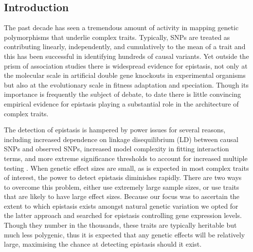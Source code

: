 \documentclass{article}
\begin{document}
\subsection{Introduction}
The past decade has seen a tremendous amount of activity in mapping genetic polymorphisms that underlie complex traits. Typically, SNPs are treated as contributing linearly, independently, and cumulatively to the mean of a trait and this has been successful in identifying hundreds of causal variants. Yet outside the prism of association studies there is widespread evidence for epistasis, not only at the molecular scale in artificial double gene knockouts in experimental organisms but also at the evolutionary scale in fitness adaptation and speciation. Though its importance is frequently the subject of debate, to date there is little convincing empirical evidence for epistasis playing a substantial role in the architecture of complex traits.

The detection of epistasis is hampered by power issues for several reasons, including increased dependence on linkage disequilibrium (LD) between causal SNPs and observed SNPs, increased model complexity in fitting interaction terms, and more extreme significance thresholds to account for increased multiple testing \cite{Hemani2013}. When genetic effect sizes are small, as is expected in most complex traits of interest, the power to detect epistasis diminishes rapidly. There are two ways to overcome this problem, either use extremely large sample sizes, or use traits that are likely to have large effect sizes. Because our focus was to ascertain the extent to which epistasis exists amongst natural genetic variation we opted for the latter approach and searched for epistasis controlling gene expression levels. Though they number in the thousands, these traits are typically heritable but much less polygenic, thus it is expected that any genetic effects will be relatively large, maximising the chance at detecting epistasis should it exist.
\end{document}
